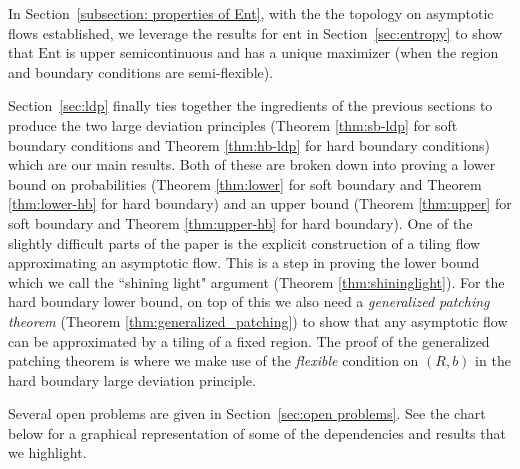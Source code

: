 \documentclass[11pt]{article}
\theoremstyle{remark}
\theoremstyle{definition}
\newcommand{\ent}{\text{ent}}
\newcommand{\Ent}{\text{Ent}}
\begin{document}
In Section~\ref{subsection: properties of Ent}, with the the topology on asymptotic flows established, we leverage the results for $\ent$ in Section~\ref{sec:entropy} to show that $\Ent$ is upper semicontinuous and has a unique maximizer (when the region and boundary conditions are semi-flexible). 

Section~\ref{sec:ldp} finally ties together the ingredients of the previous sections to produce the two large deviation principles (Theorem \ref{thm:sb-ldp} for soft boundary conditions and Theorem \ref{thm:hb-ldp} for hard boundary conditions) which are our main results. Both of these are broken down into proving a lower bound on probabilities (Theorem \ref{thm:lower} for soft boundary and Theorem \ref{thm:lower-hb} for hard boundary) and an upper bound (Theorem \ref{thm:upper} for soft boundary and Theorem \ref{thm:upper-hb} for hard boundary). One of the slightly difficult parts of the paper is the explicit construction of a tiling flow approximating an asymptotic flow.  This is a step in proving the lower bound which we call the ``shining light" argument (Theorem \ref{thm:shininglight}). For the hard boundary lower bound, on top of this we also need a \textit{generalized patching theorem} (Theorem \ref{thm:generalized_patching}) to show that any asymptotic flow can be approximated by a tiling of a fixed region. The proof of the generalized patching theorem is where we make use of the \textit{flexible} condition on $(R,b)$ in the hard boundary large deviation principle. 

Several open problems are given in Section~\ref{sec:open problems}. See the chart below for a graphical representation of some of the dependencies and results that we highlight.

\footnotesize
{} %
\end{document}
